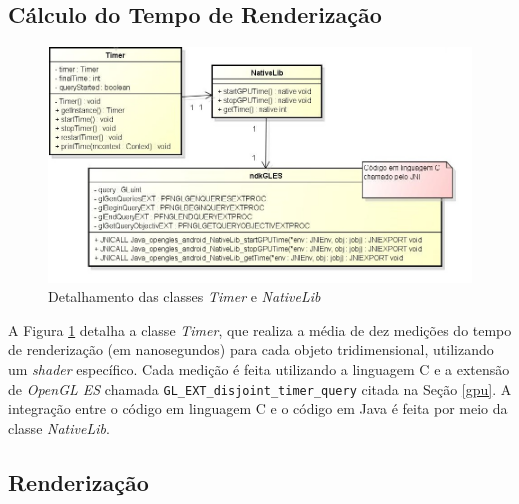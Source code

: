 \subsection{Cálculo do Tempo de Renderização}      

	\begin{figure}[ht]
	\centering
		\includegraphics[keepaspectratio=true,scale=0.6]{figuras/timer_nativelib.jpg}
	\caption{Detalhamento das classes \textit{Timer} e \textit{NativeLib}}
	\label{timer_nativelib}
	\end{figure}

	A Figura \ref{timer_nativelib} detalha a classe \textit{Timer}, que realiza a média de dez medições do tempo de renderização (em nanosegundos) para cada objeto tridimensional, utilizando um \textit{shader} específico. Cada medição é feita utilizando a linguagem C e a extensão de \textit{OpenGL ES} chamada \texttt{GL\_EXT\_disjoint\_timer\_query} citada na Seção \ref{gpu}.  A integração entre o código em linguagem C e o código em Java é feita por meio da classe \textit{NativeLib}.

\subsection{Renderização}    

